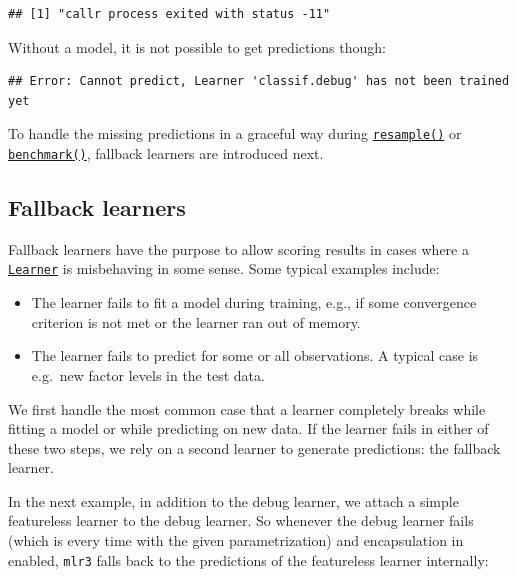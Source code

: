 \documentclass[
]{scrbook}
\newenvironment{Shaded}{\begin{snugshade}}{\end{snugshade}}
\newcommand{\FunctionTok}[1]{\textcolor[rgb]{0.00,0.00,0.00}{#1}}
\newcommand{\NormalTok}[1]{#1}
\newcommand{\SpecialCharTok}[1]{\textcolor[rgb]{0.00,0.00,0.00}{#1}}
\providecommand{\tightlist}{%
  \setlength{\itemsep}{0pt}\setlength{\parskip}{0pt}}
\renewenvironment{Shaded} {\begin{snugshade}\small} {\end{snugshade}}
\begin{document}
\begin{verbatim}
## [1] "callr process exited with status -11"
\end{verbatim}

Without a model, it is not possible to get predictions though:

\begin{Shaded}
\end{Shaded}

\begin{verbatim}
## Error: Cannot predict, Learner 'classif.debug' has not been trained yet
\end{verbatim}

To handle the missing predictions in a graceful way during \href{https://mlr3.mlr-org.com/reference/resample.html}{\texttt{resample()}} or \href{https://mlr3.mlr-org.com/reference/benchmark.html}{\texttt{benchmark()}}, fallback learners are introduced next.

\hypertarget{fallback-learners}{%
\subsection{Fallback learners}\label{fallback-learners}}

Fallback learners have the purpose to allow scoring results in cases where a \href{https://mlr3.mlr-org.com/reference/Learner.html}{\texttt{Learner}} is misbehaving in some sense.
Some typical examples include:

\begin{itemize}
\tightlist
\item
  The learner fails to fit a model during training, e.g., if some convergence criterion is not met or the learner ran out of memory.
\item
  The learner fails to predict for some or all observations.
  A typical case is e.g.~new factor levels in the test data.
\end{itemize}

We first handle the most common case that a learner completely breaks while fitting a model or while predicting on new data.
If the learner fails in either of these two steps, we rely on a second learner to generate predictions: the fallback learner.

In the next example, in addition to the debug learner, we attach a simple featureless learner to the debug learner.
So whenever the debug learner fails (which is every time with the given parametrization) and encapsulation in enabled, \texttt{mlr3} falls back to the predictions of the featureless learner internally:
\end{document}
